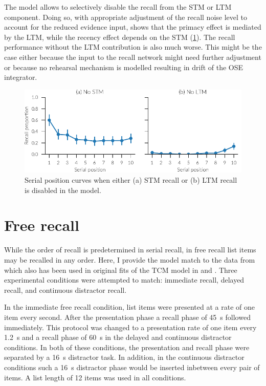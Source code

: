 The model allows to selectively disable the recall from the STM or LTM component.
Doing so, with appropriate adjustment of the recall noise level to account for the reduced evidence input, shows that the primacy effect is mediated by the LTM, while the recency effect depends on the STM (\cref{fig:results-no_xtm}).
The recall performance without the LTM contribution is also much worse.
This might be the case either because the input to the recall network might need further adjustment or because no rehearsal mechanism is modelled resulting in drift of the OSE integrator.
\begin{figure}
    \centering
    \includegraphics{figures/results/no_xtm}
    \caption[Serial position curves with disabled STM/LTM]{Serial position curves when either (a) STM recall or (b) LTM recall is disabled in the model.}\label{fig:results-no_xtm}
\end{figure}


\section{Free recall}
While the order of recall is predetermined in serial recall, in free recall list items may be recalled in any order.
Here, I provide the model match to the data from \textcite{Howard1999} which also has been used in original fits of the TCM model in \textcite{Howard2002} and \textcite{Sederberg2008}.
Three experimental conditions were attempted to match: immediate recall, delayed recall, and continuous distractor recall.

In the immediate free recall condition, list items were presented at a rate of one item every second.
After the presentation phase a recall phase of \SI{45}{\second} followed immediately.
This protocol was changed to a presentation rate of one item every \SI{1.2}{\second} and a recall phase of \SI{60}{\second} in the delayed and continuous distractor conditions.
In both of these conditions, the presentation and recall phase were separated by a \SI{16}{\second} distractor task.
In addition, in the continuous distractor conditions such a \SI{16}{\second} distractor phase would be inserted inbetween every pair of items.
A list length of 12 items was used in all conditions.

